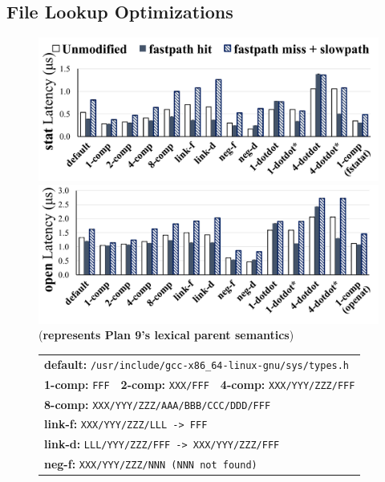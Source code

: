 
\subsection{File Lookup Optimizations}

\begin{figure}
\scriptsize
\centering
\includegraphics[width=4.5in]{dcache/plots/lm_stat.pdf} \\
\vspace{-5pt}
\includegraphics[width=4.5in]{dcache/plots/lm_open.pdf} \\
{\scriptsize ({\bf * represents Plan 9's lexical parent semantics})}
\begin{tabular}{lll}
\multicolumn{3}{l}{\scriptsize {\bf default:} \tt /usr/include/gcc-x86\_64-linux-gnu/sys/types.h} \\
{\scriptsize {\bf 1-comp:} \tt FFF} &
{\scriptsize {\bf 2-comp:} \tt XXX/FFF} &
{\scriptsize {\bf 4-comp:} \tt XXX/YYY/ZZZ/FFF} \\
\multicolumn{3}{l}{\scriptsize {\bf 8-comp:} \tt XXX/YYY/ZZZ/AAA/BBB/CCC/DDD/FFF} \\
\multicolumn{3}{l}{\scriptsize {\bf link-f:} \tt XXX/YYY/ZZZ/LLL -> FFF} \\
\multicolumn{3}{l}{\scriptsize {\bf link-d:} \tt LLL/YYY/ZZZ/FFF -> XXX/YYY/ZZZ/FFF} \\
\multicolumn{3}{l}{\scriptsize {\bf neg-f:} \tt XXX/YYY/ZZZ/NNN (NNN not found)} \\

\end{tabular}
\end{figure}
